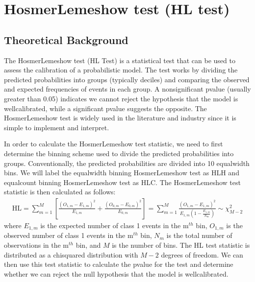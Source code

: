 \documentclass[letterpaper,10pt,english]{sphinxmanual}
\begin{document}
\sphinxstepscope


\chapter{Hosmer\sphinxhyphen{}Lemeshow test (HL test)}
\label{\detokenize{notebooks/hl_test:Hosmer-Lemeshow-test-(HL-test)}}\label{\detokenize{notebooks/hl_test::doc}}

\section{Theoretical Background}
\label{\detokenize{notebooks/hl_test:Theoretical-Background}}
\sphinxAtStartPar
The Hosmer\sphinxhyphen{}Lemeshow test (HL Test) is a statistical test that can be used to assess the calibration of a probabilistic model. The test works by dividing the predicted probabilities into groups (typically deciles) and comparing the observed and expected frequencies of events in each group. A non\sphinxhyphen{}significant p\sphinxhyphen{}value (usually greater than 0.05) indicates we cannot reject the hypothesis that the model is well\sphinxhyphen{}calibrated, while a significant p\sphinxhyphen{}value suggests the opposite. The Hosmer\sphinxhyphen{}Lemeshow test is
widely used in the literature and industry since it is simple to implement and interpret.

\sphinxAtStartPar
In order to calculate the Hosmer\sphinxhyphen{}Lemeshow test statistic, we need to first determine the binning scheme used to divide the predicted probabilities into groups. Conventionally, the predicted probabilities are divided into 10 equal\sphinxhyphen{}width bins. We will label the equal\sphinxhyphen{}width binning Hosmer\sphinxhyphen{}Lemeshow test as HL\sphinxhyphen{}H and equal\sphinxhyphen{}count binning Hosmer\sphinxhyphen{}Lemeshow test as HL\sphinxhyphen{}C. The Hosmer\sphinxhyphen{}Lemeshow test statistic is then calculated as follows:
\begin{equation*}
\begin{split}\text{HL} = \sum_{m=1}^{M} \left[\frac{(O_{1,m}-E_{1,m})^2}{E_{1,m}} + \frac{(O_{0,m}-E_{0,m})^2}{E_{0,m}}\right]  = \sum_{m=1}^{M} \frac{(O_{1,m}-E_{1,m})^2}{E_{1,m}(1-\frac{E_{1,m}}{N_m})} \sim \chi^2_{M-2}\end{split}
\end{equation*}
\sphinxAtStartPar
where \(E_{1,m}\) is the expected number of class 1 events in the \(\text{m}^{th}\) bin, \(O_{1,m}\) is the observed number of class 1 events in the \(\text{m}^{th}\) bin, \(N_m\) is the total number of observations in the \(\text{m}^{th}\) bin, and \(M\) is the number of bins. The HL test statistic is distributed as a chi\sphinxhyphen{}squared distribution with \(M-2\) degrees of freedom. We can then use this test statistic to calculate the p\sphinxhyphen{}value for the test and determine
whether we can reject the null hypothesis that the model is well\sphinxhyphen{}calibrated.
\end{document}

